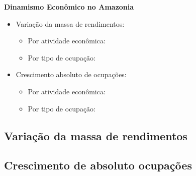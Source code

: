 \documentclass[8pt]{beamer}
\begin{document}
\begin{frame}[label=indice_principal_amz_am]{}

\textit{\hyperlink{indice_principal}{}}

\textbf{Dinamismo Econômico no Amazonia}
\vspace{2mm}

\begin{itemize}

\item{Variação da massa de rendimentos:
	\begin{itemize}
	\item{Por atividade econômica: \hyperlink{amzamrkngvmassaporcnae2dig}{}}
	\item{Por tipo de ocupação: \hyperlink{amzamrkngvmassaporcod2dig}{}}
	\end{itemize}
}
\vspace{1mm}

\item{Crescimento  absoluto de ocupações:
	\begin{itemize}
	\item{Por atividade econômica: \hyperlink{amzamrkngnocuporcnae2dig}{}}
	\item{Por tipo de ocupação: \hyperlink{amzamrkngnocuporcod2dig}{}}
	\end{itemize}
}
\vspace{1mm}

\end{itemize}

\end{frame}


\subsection{Variação da massa de rendimentos}

\begin{frame}
\textit{\hyperlink{indice_principal_amz_am}{}}

\end{frame}

\begin{frame}
\textit{\hyperlink{indice_principal_amz_am}{}}

\end{frame}

\subsection{Crescimento de absoluto ocupações}
\end{document}
